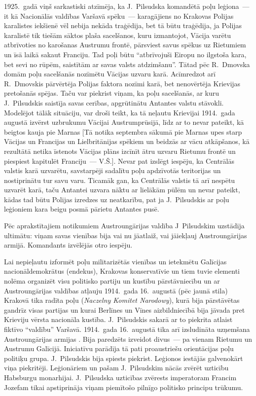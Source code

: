 \documentclass[twoside,a5paper,12pt,fleqn,openany]{extbook}
\newcommand{\pltxti}[1]{\textit{\textpolish{#1}}}
\begin{document}
1925.~gadā viņš sarkastiski atzīmēja, ka J.~Pilsudska komandētā poļu leģiona~--- it kā Nacionālās valdības Varšavā spēku~--- karagājiens no Krakovas Polijas karalistes iekšienē vēl nebija nekāda traģēdija, bet tā būtu traģēdija, ja Polijas karalistē tik tiešām sāktos plaša sacelšanos, kuru izmantojot, Vācija varētu atbrīvoties no karošanas Austrumu frontē, pārsviest savus spēkus uz Rietumiem un īsā laikā sakaut Franciju. Tad poļi būtu ``atbrīvojuši Eiropu no ilgstoša kara, bet sevi no rūpēm, saistītām ar savas valsts atdzimšanu''. Tātad pēc R.~Dmovska domām poļu sacelšanās nozīmētu Vācijas uzvaru karā. Acīmredzot arī R.~Dmovskis pārvērtēja Polijas faktora nozīmi karā, bet nenovērtēja Krievijas pretošanās spējas. Taču var piekrist viņam, ka poļu sacelšanās, ar kuru J.~Pilsudskis saistīja savas cerības, apgrūtinātu Antantes valstu stāvokli. Modelējot tālāk situāciju, var droši teikt, ka tā neļautu Krievijai 1914.~gada augustā izvērst uzbrukumu Vācijai Austrumprūsijā, līdz ar to nevar pateikt, kā beigtos kauja pie Marnas [Tā notika septembra sākumā pie Marnas upes starp Vācijas un Francijas un Lielbritānijas spēkiem un beidzās ar vācu atkāpšanos, kā rezultātā netika īstenots Vācijas plāns izcīnīt ātru uzvaru Rietumu frontē un piespiest kapitulēt Franciju~--- V.Š.]. Nevar pat izslēgt iespēju, ka Centrālās valstis karā uzvarētu, savstarpēji sadalītu poļu apdzīvotās teritorijas un nostiprinātu tur savu varu. Ticamāk gan, ka Centrālās valstis tā arī nespētu uzvarēt karā, taču Antantei uzvara nāktu ar lielākām pūlēm un nevar pateikt, kādas tad būtu Polijas izredzes uz neatkarību, pat ja J.~Pilsudskis ar poļu leģioniem kara beigu posmā pārietu Antantes pusē.

Pēc aprakstītajiem notikumiem Austroungārijas valdība J~Pilsudskim uzstādīja ultimātu: viņam savas vienības bija vai nu jāatlaiž, vai jāiekļauj Austroungārijas armijā. Komandants izvēlējās otro iespēju.

Lai nepieļautu izformēt poļu militarizētās vienības un ietekmētu Galīcijas nacionāldemokrātus (endekus), Krakovas konservatīvie un tiem tuvie elementi nolēma organizēt visu politisko partiju un kustību pārstāvniecību un ar Austroungārijas valdības atļauju 1914.~gada 16.~augustā (pēc jaunā stila) Krakovā tika radīta poļu  (\pltxti{Naczelny Komitet Narodowy}), kurā bija pārstāvētas gandrīz visas partijas un kurai Berlīnes un Vīnes aizbildniecībā bija jāvada pret Krieviju vērsta nacionāla kustība. J.~Pilsudskis sakarā ar to piekrita atlaist fiktīvo ``valdību'' Varšavā. 1914.~gada 16.~augustā tika arī izsludināta uzņemšana Austroungārijas armijas . Bija paredzēts izveidot divus~--- pa vienam Rietumu un Austrumu Galīcijā. Iniciatīvu parādīja tā pati proaustriešu orientācijas poļu politiķu grupa. J.~Pilsudskis bija spiests piekrist. Leģionos iestājās galvenokārt viņa piekritēji. Leģionāriem un pašam J.~Pilsudskim nācās zvērēt uzticību Habsburgu monarhijai. J.~Pilsudska uzticības zvērests imperatoram Francim Jozefam tikai apstiprināja viņam piemītošo pilnīgo politisko principu trūkumu.
\end{document}
